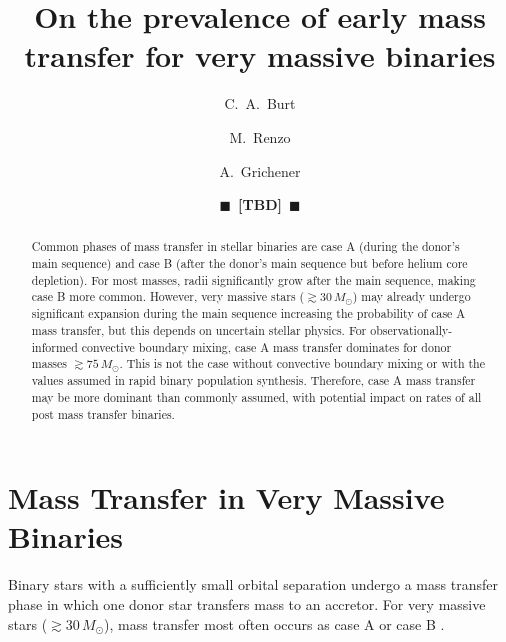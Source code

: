 \documentclass[twocolumn]{aastex63}
\newcommand{\todo}[1]{{\large $\blacksquare$~\textbf{\color{red}[#1]}}~$\blacksquare$}
\begin{document}
\title{On the prevalence of early mass transfer for very massive binaries}

\author[0009-0008-2061-4946]{C.~A.~Burt}

\author[0000-0002-6718-9472]{M.~Renzo}

\author[0000-0002-2215-1841]{A.~Grichener}

\author{\todo{TBD}}

\begin{abstract}
  Common phases of mass transfer in stellar binaries are case A
  (during the donor's main sequence) and case B (after the donor's
  main sequence but before helium core depletion). For most masses,
  radii significantly grow after the main sequence, making case B more
  common. However, very massive stars ($\gtrsim 30\,M_\odot$) may
  already undergo significant expansion during the main sequence
  increasing the probability of case A mass transfer, but this depends
  on uncertain stellar physics. For observationally-informed
  convective boundary mixing, case A mass transfer dominates for donor
  masses $\gtrsim 75 \, M_{\odot}$.  This is not the case without
  convective boundary mixing or with the values assumed in rapid
  binary population synthesis. Therefore, case A mass transfer may be
  more dominant than commonly assumed, with potential impact on rates
  of all post mass transfer binaries.
\end{abstract}

\section{Mass Transfer in Very Massive Binaries}

Binary stars with a sufficiently small orbital separation undergo a
mass transfer phase in which one donor star transfers mass to an
accretor. For very massive stars ($ \gtrsim 30 \, M_{\odot}$), mass
transfer most often occurs as case A or case B \cite{kippenhahn:67}.
\end{document}
